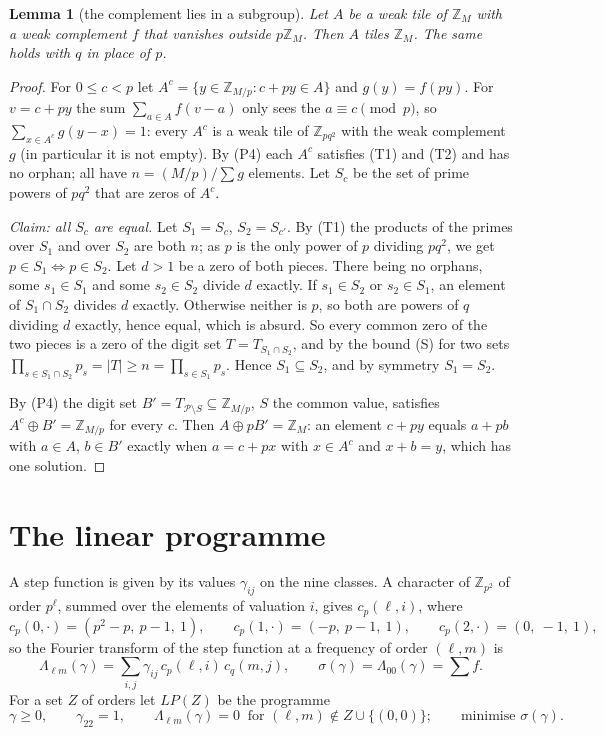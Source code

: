 \documentclass[11pt,a4paper]{amsart}
\newtheorem{lemma}[theorem]{Lemma}
\theoremstyle{definition}
\theoremstyle{remark}
\newcommand{\Z}{\mathbb{Z}}
\newcommand{\gs}{\gamma}
\begin{document}
\begin{lemma}[the complement lies in a subgroup]\label{C:lem:lift}
Let $A$ be a weak tile of $\Z_M$ with a weak complement $f$ that vanishes outside $p\Z_M$. Then $A$ tiles
$\Z_M$. The same holds with $q$ in place of $p$.
\end{lemma}
\begin{proof}
For $0\le c<p$ let $A^c=\{y\in\Z_{M/p}:c+py\in A\}$ and $g(y)=f(py)$. For $v=c+py$ the sum $\sum_{a\in A}f(v-a)$
only sees the $a\equiv c\pmod p$, so $\sum_{x\in A^c}g(y-x)=1$: every $A^c$ is a weak tile of $\Z_{pq^2}$ with the
weak complement $g$ (in particular it is not empty). By (P4) each $A^c$ satisfies (T1) and (T2) and has no
orphan; all have $n=(M/p)/\sum g$ elements. Let $S_c$ be the set of prime powers of $pq^2$ that are zeros of
$A^c$.

\emph{Claim: all $S_c$ are equal.} Let $S_1=S_c$, $S_2=S_{c'}$. By (T1) the products of the primes over $S_1$ and
over $S_2$ are both $n$; as $p$ is the only power of $p$ dividing $pq^2$, we get $p\in S_1\iff p\in S_2$. Let
$d>1$ be a zero of both pieces. There being no orphans, some $s_1\in S_1$ and some $s_2\in S_2$ divide $d$
exactly. If $s_1\in S_2$ or $s_2\in S_1$, an element of $S_1\cap S_2$ divides $d$ exactly. Otherwise neither is
$p$, so both are powers of $q$ dividing $d$ exactly, hence equal, which is absurd. So every common zero of the
two pieces is a zero of the digit set $T=T_{S_1\cap S_2}$, and by the bound (S) for two sets
$\prod_{s\in S_1\cap S_2}p_s=|T|\ge n=\prod_{s\in S_1}p_s$. Hence $S_1\subseteq S_2$, and by symmetry
$S_1=S_2$.

By (P4) the digit set $B'=T_{\mathcal P\setminus S}\subseteq\Z_{M/p}$, $S$ the common value, satisfies
$A^c\oplus B'=\Z_{M/p}$ for every $c$. Then $A\oplus pB'=\Z_M$: an element $c+py$ equals $a+pb$ with $a\in A$,
$b\in B'$ exactly when $a=c+px$ with $x\in A^c$ and $x+b=y$, which has one solution.
\end{proof}

\section{The linear programme}\label{C:sec:LP}

A step function is given by its values $\gs_{ij}$ on the nine classes. A character of $\Z_{p^2}$ of order
$p^\ell$, summed over the elements of valuation $i$, gives $c_p(\ell,i)$, where
\[
 c_p(0,\cdot)=(p^2-p,\ p-1,\ 1),\qquad c_p(1,\cdot)=(-p,\ p-1,\ 1),\qquad c_p(2,\cdot)=(0,\ -1,\ 1),
\]
so the Fourier transform of the step function at a frequency of order $(\ell,m)$ is
\[
 \Lambda_{\ell m}(\gs)=\sum_{i,j}\gs_{ij}\,c_p(\ell,i)\,c_q(m,j),\qquad \sigma(\gs)=\Lambda_{00}(\gs)=\sum f .
\]
For a set $Z$ of orders let $LP(Z)$ be the programme
\[
 \gs\ge0,\qquad \gs_{22}=1,\qquad \Lambda_{\ell m}(\gs)=0\ \text{ for } (\ell,m)\notin Z\cup\{(0,0)\};\qquad
 \text{minimise }\sigma(\gs).
\]
\end{document}
